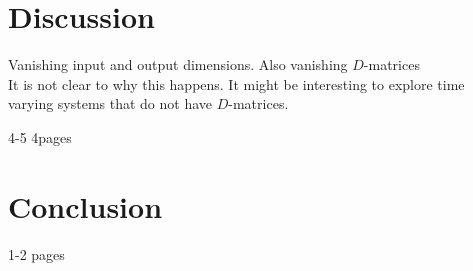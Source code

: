 \documentclass[doctype=mastersthesis,BCOR=15mm,biblatex]{ldvbook}%
\begin{document}
\chapter{Discussion}

Vanishing  input and output dimensions. Also vanishing $D$-matrices\\
It is not clear to why this happens.
It might be interesting to explore time varying systems that do not have $D$-matrices.


4-5 4pages

\chapter{Conclusion}
1-2 pages



\the\textwidth



\printbibliography{}
\end{document}
